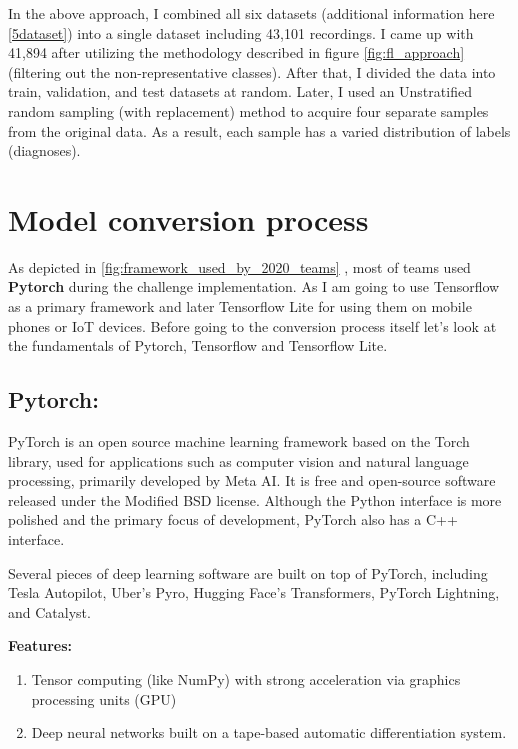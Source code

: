 In the above approach, I combined all six datasets (additional information here \ref{5dataset}) into a single dataset including 43,101 recordings. I came up with 41,894 after utilizing the methodology described in figure \ref{fig:fl_approach} (filtering out the non-representative classes). After that, I divided the data into train, validation, and test datasets at random. Later, I used an Unstratified random sampling (with replacement) method to acquire four separate samples from the original data. As a result, each sample has a varied distribution of labels (diagnoses).

\newpage 

\section{Model conversion process} \label{4mconverionp}

As depicted in \ref{fig:framework_used_by_2020_teams} , most of teams used \textbf{Pytorch} during the challenge implementation. As I am going to use Tensorflow as a primary framework and later Tensorflow Lite for using them on mobile phones or IoT devices. Before going to the conversion process itself let's look at the fundamentals of Pytorch, Tensorflow and Tensorflow Lite.


\subsection{Pytorch:}
PyTorch is an open source machine learning framework based on the Torch library, used for applications such as computer vision and natural language processing, primarily developed by Meta AI. It is free and open-source software released under the Modified BSD license. Although the Python interface is more polished and the primary focus of development, PyTorch also has a C++ interface.

Several pieces of deep learning software are built on top of PyTorch, including Tesla Autopilot, Uber's Pyro, Hugging Face's Transformers, PyTorch Lightning, and Catalyst.

\textbf{Features:}
\begin{enumerate}
  \item Tensor computing (like NumPy) with strong acceleration via graphics processing units (GPU)
  \item Deep neural networks built on a tape-based automatic differentiation system.
\end{enumerate}

